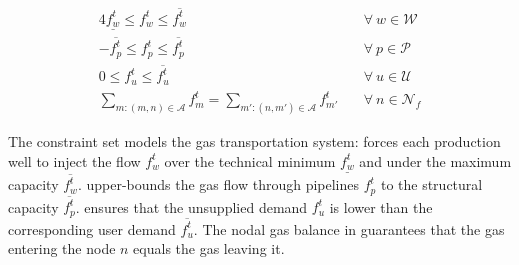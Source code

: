 \begin{alignat}{4}
    \underline{f_{w}^t} \leq f_{w}^t \leq \overline{f_{w}^t} &\quad \forall \ w \in \mathcal{W} \label{eq:well_limits} \\
    -\overline{f_{p}^t} \leq f_{p}^t \leq \overline{f_{p}^t} &\quad \forall \ p \in \mathcal{P} \label{eq:pipe_limits} \\
    0 \leq f_{u}^{t} \leq \overline{f_{u}^{t}} &\quad \forall \ u \in \mathcal{U} \label{eq:dem_limit_gas} \\
    \sum_{m:(m,n)\in\mathcal{A}}{f_{m}^t} = \sum_{m':(n,m')\in\mathcal{A}}{f_{m'}^t} &\quad \forall \ n \in \mathcal{N}_f \label{eq:gas_balance}
\end{alignat}

The constraint set models the gas transportation system:  forces each production well to inject the flow $f_{w}^t$ over the technical minimum $\underline{f_{w}^t}$ and under the maximum capacity $\overline{f_{w}^t}$.  upper-bounds the gas flow through pipelines $f_{p}^t$ to the structural capacity $\overline{f_{p}^t}$.  ensures that the unsupplied demand $f_{u}^{t}$ is lower than the corresponding user demand $\overline{f_{u}^{t}}$. The nodal gas balance in  guarantees that the gas entering the node $n$ equals the gas leaving it. 

